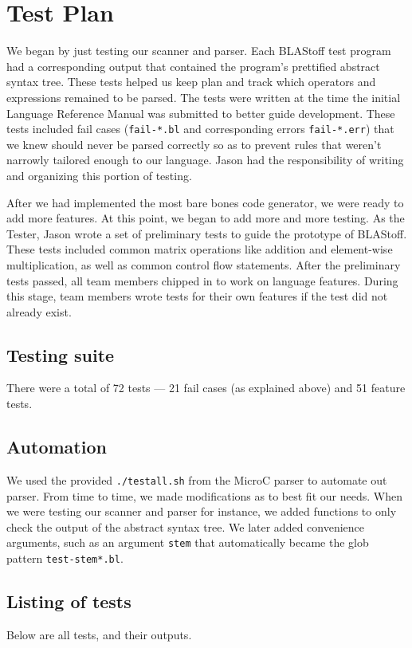 \section{Test Plan}

We began by just testing our scanner and parser. Each BLAStoff test program had a corresponding output that contained the program's prettified abstract syntax tree. These tests helped us keep plan and track which operators and expressions remained to be parsed. The tests were written at the time the initial Language Reference Manual was submitted to better guide development. These tests included fail cases (\texttt{fail-*.bl} and corresponding errors \texttt{fail-*.err}) that we knew should never be parsed correctly so as to prevent rules that weren't narrowly tailored enough to our language. Jason had the responsibility of writing and organizing this portion of testing.

After we had implemented the most bare bones code generator, we were ready to add more features. At this point, we began to add more and more testing. As the Tester, Jason wrote a set of preliminary tests to guide the prototype of BLAStoff. These tests included common matrix operations like addition and element-wise multiplication, as well as common control flow statements. After the preliminary tests passed, all team members chipped in to work on language features. During this stage, team members wrote tests for their own features if the test did not already exist.

\subsection{Testing suite}

There were a total of 72 tests — 21 fail cases (as explained above) and 51 feature tests.

\subsection{Automation}

We used the provided \texttt{./testall.sh} from the MicroC parser to automate out parser. From time to time, we made modifications as to best fit our needs. When we were testing our scanner and parser for instance, we added functions to only check the output of the abstract syntax tree. We later added convenience arguments, such as an argument \texttt{stem} that automatically became the glob pattern \texttt{test-stem*.bl}.

\subsection{Listing of tests}
Below are all tests, and their outputs.\\
